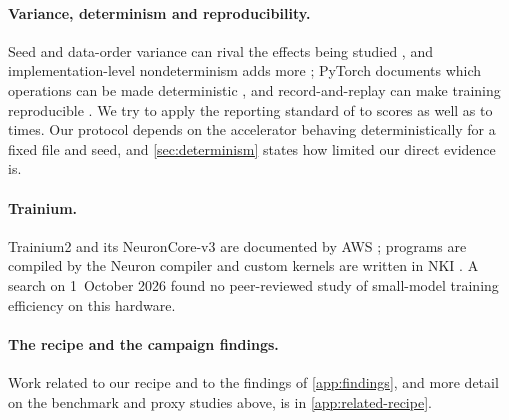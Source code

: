 \paragraph{Variance, determinism and reproducibility.} Seed and data-order variance can rival the effects being
studied \citep{picard2021seed,dodge2020finetuning,bouthillier2021variance}, and implementation-level nondeterminism
adds more \citep{pham2020variance,nagarajan2018deterministic,zhuang2021randomness,summers2021nondeterminism}; PyTorch
documents which operations can be made deterministic \citep{pytorch_reproducibility}, and record-and-replay can make
training reproducible \citep{chen2022reproducible}. We try to apply the reporting standard of
\citet{hoefler2015scientific} to scores as well as to times. Our protocol depends on the accelerator behaving
deterministically for a fixed file and seed, and \cref{sec:determinism} states how limited our direct evidence is.

\paragraph{Trainium.} Trainium2 and its NeuronCore-v3 are documented by AWS
\citep{aws_trainium,aws_trainium2_arch,aws_trn2_arch,aws_neuroncore_v3}; programs are compiled by the Neuron
compiler \citep{aws_neuron_docs} and custom kernels are written in NKI \citep{aws_nki_docs}. A search on
1~October 2026 found no peer-reviewed study of small-model training efficiency on this hardware.

\paragraph{The recipe and the campaign findings.} Work related to our recipe and to the findings of
\cref{app:findings}, and more detail on the benchmark and proxy studies above, is in \cref{app:related-recipe}.
